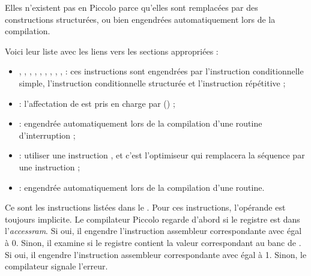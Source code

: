 
Elles n’existent pas en Piccolo parce qu’elles sont remplacées par des constructions structurées, ou bien engendrées automatiquement lors de la compilation.

Voici leur liste avec les liens vers les sections appropriées :\begin{itemize}
  \item {}, , , , , , , , ,  : ces instructions sont engendrées par l’instruction conditionnelle simple, l’instruction conditionnelle structurée et l’instruction répétitive ;
  \item {} : l’affectation de  est pris en charge par  () ;
  \item {} : engendrée automatiquement lors de la compilation d’une routine d’interruption ;
  \item {} : utiliser une instruction , et c’est l’optimiseur qui remplacera la séquence  par une instruction  ;
  \item {} : engendrée automatiquement lors de la compilation d’une routine.

\end{itemize}








Ce sont les instructions listées dans le . Pour ces instructions, l'opérande  est toujours implicite. Le compilateur Piccolo regarde d'abord si le registre  est dans l'\emph{accessram}. Si oui, il engendre l'instruction assembleur correspondante avec  égal à 0. Sinon, il examine si le registre  contient la valeur correspondant au banc de . Si oui, il engendre l'instruction assembleur correspondante avec  égal à 1. Sinon, le compilateur signale l'erreur.



